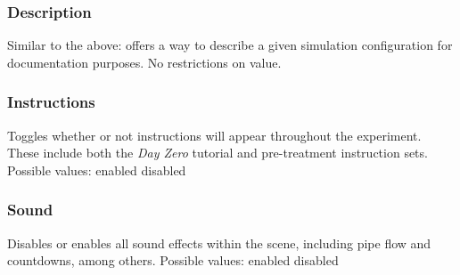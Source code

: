 \documentclass{article}
\begin{document}
\subsubsection*{Description} Similar to the above: offers a way to describe a given simulation configuration for documentation purposes. No restrictions on value. 
\pagebreak\subsubsection*{Instructions} Toggles whether or not instructions will appear throughout the experiment. These include both the \textit{Day Zero} tutorial and pre-treatment instruction sets.
\newline \indent Possible values: \newline
\indent\indent enabled \newline
\indent\indent disabled

\subsubsection*{Sound} Disables or enables all sound effects within the scene, including pipe flow and countdowns, among others.
\newline \indent Possible values: \newline
\indent\indent enabled \newline
\indent\indent disabled
\end{document}
